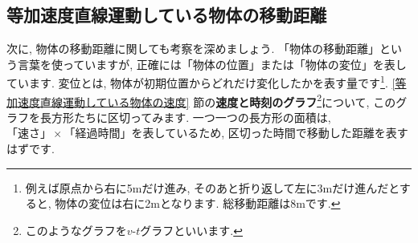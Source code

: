 \documentclass[11pt,dvipdfmx]{jsarticle}
\numberwithin{equation}{section} %
\begin{document}
\subsection{等加速度直線運動している物体の移動距離}\label{等加速度直線運動している物体の移動距離}
次に, 物体の移動距離に関しても考察を深めましょう. 「物体の移動距離」という言葉を使っていますが, 正確には「物体の位置」または「物体の変位」を表しています. 変位とは, 物体が初期位置からどれだけ変化したかを表す量です\footnote{例えば原点から右に5mだけ進み, そのあと折り返して左に3mだけ進んだとすると, 物体の変位は右に2mとなります. 総移動距離は8mです. }. \ref{等加速度直線運動している物体の速度} 節の\textbf{速度と時刻のグラフ}\footnote{このようなグラフを$v$-$t$グラフといいます.}について, このグラフを長方形たちに区切ってみます. 一つ一つの長方形の面積は, $「速さ」\times「経過時間」$を表しているため, 区切った時間で移動した距離を表すはずです. 
\end{document}
